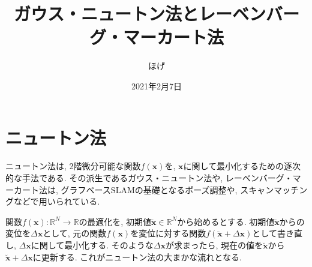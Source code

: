 \documentclass[dvipdfmx,a4paper]{jsarticle}
\title{ガウス・ニュートン法とレーベンバーグ・マーカート法}
\author{ほげ}
\date{2021年2月7日}
\begin{document}
\maketitle

\section{ニュートン法}
ニュートン法は, 2階微分可能な関数$f(\bm{x})$を, $\bm{x}$に関して最小化するための逐次的な手法である\cite{Kanamori16}.
その派生であるガウス・ニュートン法や, レーベンバーグ・マーカート法は, グラフベースSLAMの基礎となるポーズ調整\cite{Grisetti10}\cite{Konolige10}\cite{Kuemmerle11}や, スキャンマッチング\cite{Biber03}\cite{Kohlbrecher11}などで用いられている. \newline

関数$f(\bm{x}): \mathbb{R}^N \to \mathbb{R}$の最適化を, 初期値$\breve{\bm{x}} \in \mathbb{R}^N$から始めるとする.
初期値$\breve{\bm{x}}$からの変位を$\Delta \bm{x}$として, 元の関数$f(\bm{x})$を変位に対する関数$f(\breve{\bm{x}} + \Delta \bm{x})$として書き直し, $\Delta \bm{x}$に関して最小化する.
そのような$\Delta \bm{x}$が求まったら, 現在の値を$\breve{\bm{x}}$から$\breve{\bm{x}} + \Delta \bm{x}$に更新する.
これがニュートン法の大まかな流れとなる. \newline
\end{document}
